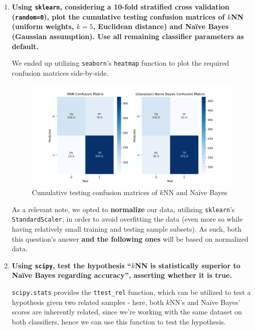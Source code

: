 \documentclass[12pt]{article}
\begin{document}
\begin{enumerate}[leftmargin=\labelsep,resume]
  \item \textbf{Using \texttt{sklearn}, considering a 10-fold stratified cross validation (\texttt{random=0}), plot the cumulative
          testing confusion matrices of $k$NN (uniform weights, $k = 5$, Euclidean distance) and Naïve Bayes
          (Gaussian assumption). Use all remaining classifier parameters as default.}

        We ended up utilizing \texttt{seaborn}'s \texttt{heatmap} function to plot the
        required confusion matrices side-by-side.

        \begin{figure}[h]
          \centering
          \includegraphics[width=\textwidth]{../assets/hw2-2.1.png}
          \caption{Cumulative testing confusion matrices of $k$NN and Naïve Bayes}
          \label{fig:fig1}
        \end{figure}

        \begin{sloppypar}
          As a relevant note, we opted to \textbf{normalize} our data, utilizing \texttt{sklearn}'s
          \texttt{StandardScaler}, in order to avoid overfitting the data (even more so while
          having relatively small training and testing sample subsets). As such, both this
          question's answer \textbf{and the following ones} will be based on normalized data.
        \end{sloppypar}

        \pagebreak

  \item \textbf{Using \texttt{scipy}, test the hypothesis “$k$NN is statistically superior to Naïve Bayes regarding
          accuracy”, asserting whether it is true.}

        \texttt{scipy.stats} provides the \texttt{ttest\_rel} function, which can be utilized
        to test a hypothesis given two related samples - here, both $k$NN's and Naïve Bayes'
        scores are inherently related, since we're working with the same dataset on both
        classifiers, hence we can use this function to test the hypothesis.


\end{enumerate}
\end{document}
